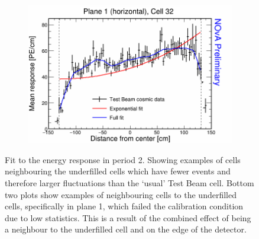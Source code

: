\begin{figure}[!hbtp]
\begin{subfigure}{0.495\textwidth}
  \end{subfigure}
  \begin{subfigure}{0.495\textwidth}
    \includegraphics[width=\linewidth]{Plots/RelativeCalibrationResults/p2_001_032.png}
  \end{subfigure} 
  \caption[Attenuation fits for underfilled cells in period 2 data]{Fit to the energy response in period 2. Showing examples of cells neighbouring the underfilled cells which have fewer events and therefore larger fluctuations than the `usual' Test Beam cell. Bottom two plots show examples of neighbouring cells to the underfilled cells, specifically in plane 1, which failed the calibration condition due to low statistics. This is a result of the combined effect of being a neighbour to the underfilled cell and on the edge of the detector.}
  \label{fig:AttenfitResultsPeriod2_UnderfilledCells}
\end{figure}



